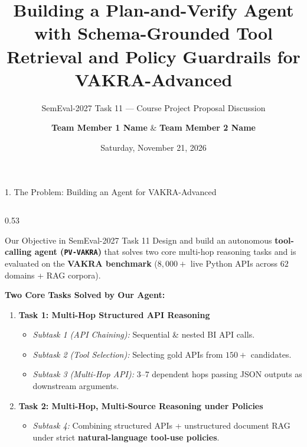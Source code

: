 \documentclass[aspectratio=169, 10pt]{beamer}
\title[SemEval-2027 Task 11: PV-VAKRA Agent]{\textbf{Building a Plan-and-Verify Agent with Schema-Grounded Tool Retrieval and Policy Guardrails for VAKRA-Advanced}}
\subtitle{SemEval-2027 Task 11 --- Course Project Proposal Discussion}
\author[Team Members]{\textbf{Team Member 1 Name} \quad \& \quad \textbf{Team Member 2 Name}}
\institute[Advanced NLP]{
  Advanced Natural Language Processing \\
  Supervised by \textbf{Prof.\ Nagwa El-Makky}
}
\date{Saturday, November 21, 2026}
\begin{document}
\begin{frame}
    \titlepage
\end{frame}

\begin{frame}{1. The Problem: Building an Agent for VAKRA-Advanced}
\begin{columns}[T, onlytextwidth]
\begin{column}{0.53\textwidth}
\begin{block}{\small Our Objective in SemEval-2027 Task 11}
\footnotesize
Design and build an autonomous \textbf{tool-calling agent (\texttt{PV-VAKRA})} that solves two core multi-hop reasoning tasks and is evaluated on the \textbf{VAKRA benchmark} ($8,000+$ live Python APIs across $62$ domains + RAG corpora).
\end{block}
\vspace{0.04cm}
{\footnotesize \textbf{Two Core Tasks Solved by Our Agent:}
\begin{enumerate}
    \setlength{\itemsep}{2pt}
    \item \textbf{Task 1: Multi-Hop Structured API Reasoning}
    \begin{itemize}
        \scriptsize
        \item \textit{Subtask 1 (API Chaining):} Sequential \& nested BI API calls.
        \item \textit{Subtask 2 (Tool Selection):} Selecting gold APIs from $150+$ candidates.
        \item \textit{Subtask 3 (Multi-Hop API):} $3\text{--}7$ dependent hops passing JSON outputs as downstream arguments.
    \end{itemize}
    \item \textbf{Task 2: Multi-Hop, Multi-Source Reasoning under Policies}
    \begin{itemize}
        \scriptsize
        \item \textit{Subtask 4:} Combining structured APIs + unstructured document RAG under strict \textbf{natural-language tool-use policies}.
    \end{itemize}
\end{enumerate}}
\end{column}


\end{columns}
\end{frame}
\end{document}
